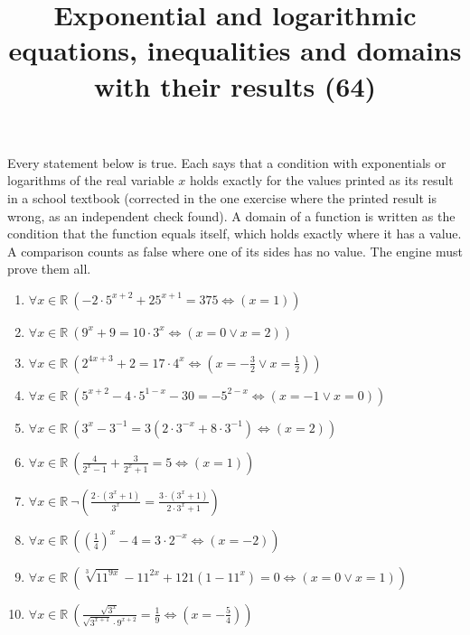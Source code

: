 \documentclass[11pt,a4paper]{article}
\title{Exponential and logarithmic equations, inequalities and domains with their results (64)}
\author{}
\date{}
\begin{document}
\maketitle
Every statement below is true. Each says that a condition with exponentials or logarithms of the real variable $x$ holds exactly for the values printed as its result in a school textbook (corrected in the one exercise where the printed result is wrong, as an independent check found). A domain of a function is written as the condition that the function equals itself, which holds exactly where it has a value. A comparison counts as false where one of its sides has no value. The engine must prove them all.

\begin{enumerate}
\item $\displaystyle \forall x \in \mathbb{R}\ \left( -2 \cdot 5^{x+2} + 25^{x+1} = 375 \iff \left( x = 1 \right) \right)$
\item $\displaystyle \forall x \in \mathbb{R}\ \left( 9^{x} + 9 = 10 \cdot 3^{x} \iff \left( x = 0 \lor x = 2 \right) \right)$
\item $\displaystyle \forall x \in \mathbb{R}\ \left( 2^{4x+3} + 2 = 17 \cdot 4^{x} \iff \left( x = -\frac{3}{2} \lor x = \frac{1}{2} \right) \right)$
\item $\displaystyle \forall x \in \mathbb{R}\ \left( 5^{x+2} - 4 \cdot 5^{1-x} - 30 = -5^{2-x} \iff \left( x = -1 \lor x = 0 \right) \right)$
\item $\displaystyle \forall x \in \mathbb{R}\ \left( 3^{x} - 3^{-1} = 3(2 \cdot 3^{-x} + 8 \cdot 3^{-1}) \iff \left( x = 2 \right) \right)$
\item $\displaystyle \forall x \in \mathbb{R}\ \left( \frac{4}{2^{x} - 1} + \frac{3}{2^{x} + 1} = 5 \iff \left( x = 1 \right) \right)$
\item $\displaystyle \forall x \in \mathbb{R}\ \lnot \left( \frac{2 \cdot (3^{x} + 1)}{3^{x}} = \frac{3 \cdot (3^{x} + 1)}{2 \cdot 3^{x} + 1} \right)$
\item $\displaystyle \forall x \in \mathbb{R}\ \left( \left(\frac{1}{4}\right)^{x} - 4 = 3 \cdot 2^{-x} \iff \left( x = -2 \right) \right)$
\item $\displaystyle \forall x \in \mathbb{R}\ \left( \sqrt[3]{11^{9x}} - 11^{2x} + 121(1 - 11^{x}) = 0 \iff \left( x = 0 \lor x = 1 \right) \right)$
\item $\displaystyle \forall x \in \mathbb{R}\ \left( \frac{\sqrt{3^{x}}}{\sqrt{3^{x+1}} \cdot 9^{x+2}} = \frac{1}{9} \iff \left( x = -\frac{5}{4} \right) \right)$

\end{enumerate}
\end{document}
